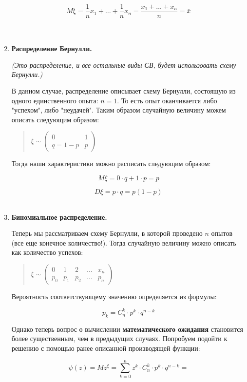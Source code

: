 \documentclass{article}
\begin{document}
\begin{enumerate}
$$M\xi = \frac{1}{n} x_1 + \ldots + \frac{1}{n}x_n = \frac{x_1 + \ldots + x_n}{n} = \overline{x}$$
\\
\\

\item \textbf{Распределение Бернулли.}

\textit{(Это распределение, и все остальные виды СВ, будет использовать схему Бернулли.)}

В данном случае, распределение описывает схему Бернулли, состоящую из одного единственного опыта: $n = 1$. То есть опыт оканчивается либо "успехом", либо "неудачей". Таким образом случайную величину можем описать следующим образом:

\begin{quote}
$\xi \sim
\begin{pmatrix}
0 & 1\\
q = 1 - p & p
\end{pmatrix}$
\end{quote}
 
Тогда наши характеристики можно расписать следующим образом:

$$M\xi = 0 \cdot q + 1 \cdot p = p$$

$$D\xi = p \cdot q = p(1 - p)$$
\\

\item \textbf{Биномиальное распределение.}

Теперь мы рассматриваем схему Бернулли, в которой проведено $n$ опытов (все еще конечное количество!). Тогда случайную величину можно описать как количество успехов:

\begin{quote}
$\xi \sim
\begin{pmatrix}
0 & 1 & 2 & \ldots & x_n\\
p_0 & p_1 & p_2 & \ldots & p_n
\end{pmatrix}$
\end{quote}

Вероятность соответствующему значению определяется из формулы:

$$p_k = C_n^k \cdot p^k \cdot q^{n - k}$$

Однако теперь вопрос о вычислении \textbf{математического ожидания} становится более существенным,
чем в предыдущих случаях. Попробуем подойти к решению с помощью ранее описанной производящей функции:

$$\psi(z) = Mz^\xi = \sum\limits_{k = 0}^n z^k \cdot C_n^k \cdot p^k \cdot q^{n - k} = $$


\end{enumerate}
\end{document}
